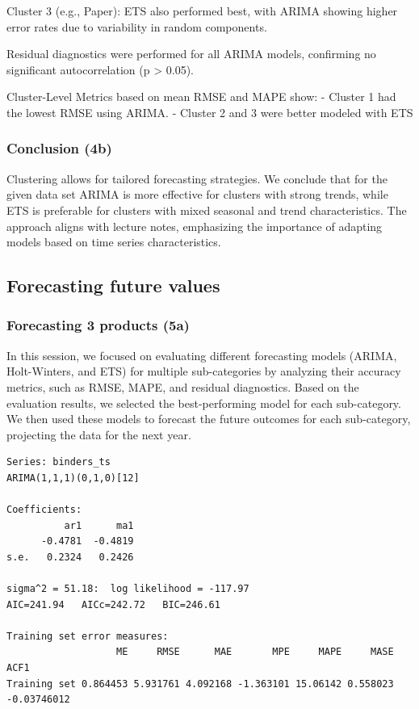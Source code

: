 \documentclass[
  letterpaper,
  DIV=11,
  numbers=noendperiod,
  oneside]{scrartcl}
\begin{document}
Cluster 3 (e.g., Paper): ETS also performed best, with ARIMA showing
higher error rates due to variability in random components.

Residual diagnostics were performed for all ARIMA models, confirming no
significant autocorrelation (p \textgreater{} 0.05).

Cluster-Level Metrics based on mean RMSE and MAPE show: - Cluster 1 had
the lowest RMSE using ARIMA. - Cluster 2 and 3 were better modeled with
ETS

\subsubsection{Conclusion (4b)}\label{conclusion-4b}

Clustering allows for tailored forecasting strategies. We conclude that
for the given data set ARIMA is more effective for clusters with strong
trends, while ETS is preferable for clusters with mixed seasonal and
trend characteristics. The approach aligns with lecture notes,
emphasizing the importance of adapting models based on time series
characteristics.

\subsection{Forecasting future values}\label{forecasting-future-values}

\subsubsection{Forecasting 3 products
(5a)}\label{forecasting-3-products-5a}

In this session, we focused on evaluating different forecasting models
(ARIMA, Holt-Winters, and ETS) for multiple sub-categories by analyzing
their accuracy metrics, such as RMSE, MAPE, and residual diagnostics.
Based on the evaluation results, we selected the best-performing model
for each sub-category. We then used these models to forecast the future
outcomes for each sub-category, projecting the data for the next year.

\begin{verbatim}
Series: binders_ts 
ARIMA(1,1,1)(0,1,0)[12] 

Coefficients:
          ar1      ma1
      -0.4781  -0.4819
s.e.   0.2324   0.2426

sigma^2 = 51.18:  log likelihood = -117.97
AIC=241.94   AICc=242.72   BIC=246.61

Training set error measures:
                   ME     RMSE      MAE       MPE     MAPE     MASE        ACF1
Training set 0.864453 5.931761 4.092168 -1.363101 15.06142 0.558023 -0.03746012
\end{verbatim}
\end{document}
